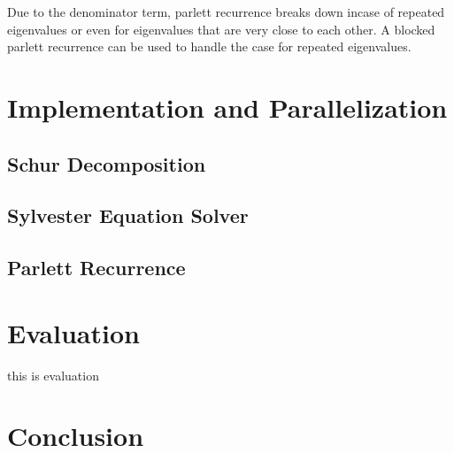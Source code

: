 \documentclass{article}
\begin{document}
Due to the denominator term, parlett recurrence breaks down incase of repeated eigenvalues or even for eigenvalues that are very close to each other. A blocked parlett recurrence can be used to handle the case for repeated eigenvalues.

\section{Implementation and Parallelization}

\subsection{Schur Decomposition}




\subsection{Sylvester Equation Solver}



\subsection{Parlett Recurrence}

\section{Evaluation}
this is evaluation
\section{Conclusion}
\end{document}
